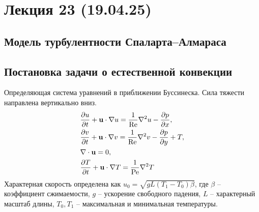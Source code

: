 \section{Лекция 23 (19.04.25)}

\subsection{Модель турбулентности Спаларта--Алмараса}

\subsection{Постановка задачи о естественной конвекции}
Определяющая система уравнений в приближении Буссинеска.
Сила тяжести направлена вертикально вниз.
\begin{equation}
\label{eq:natural_convection_y}
\begin{aligned}
& \frac{\partial u}{\partial t} + \boldsymbol{\rm u}\cdot\nabla u = \frac{1}{\mathrm{Re}} \nabla^2 u - \frac{\partial p}{\partial x}, \\
& \frac{\partial v}{\partial t} + \boldsymbol{\rm u}\cdot\nabla v = \frac{1}{\mathrm{Re}} \nabla^2 v - \frac{\partial p}{\partial y} + T, \\
& \nabla \cdot \boldsymbol{\rm u} = 0, \\
& \frac{\partial T}{\partial t} + \boldsymbol{\rm u}\cdot\nabla T = \frac{1}{\mathrm{Pe}} \nabla^2 T
\end{aligned}
\end{equation}
Характерная скорость определена как
$u_0 = \sqrt{gL(T_1 - T_0) \beta}$, где $\beta$ -- коэффициент сжимаемости, $g$ -- ускорение свободного падения, $L$ -- характерный масштаб длины, $T_0, T_1$ -- максимальная и минимальная температуры.
